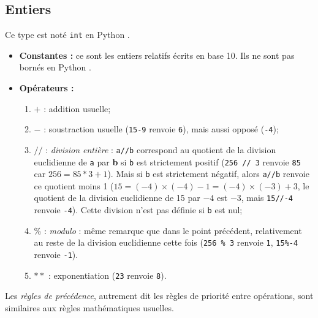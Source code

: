 \subsection{Entiers}
\begin{defi}[Entiers]
Ce type est noté \texttt{int} en Python .\\
\begin{itemize}
\item \textbf{Constantes :} ce sont les entiers relatifs écrits en base 10. Ils ne sont pas 
bornés en Python .
\item \textbf{Opérateurs :}
\begin{enumerate}
 \item $+$ : addition usuelle;
 \item $-$ : soustraction usuelle (\texttt{15-9} renvoie \texttt{6}), mais aussi opposé (\texttt{-4});
\item  $//$ : \emph{division entière} : \texttt{a//b} correspond au quotient de la 
division euclidienne de \texttt{a} par \textbf{b} si \texttt{b} est strictement positif 
(\texttt{256 // 3} renvoie \texttt{85} car $256 = 85*3 + 1$). Mais si \texttt{b} est strictement 
négatif, alors \texttt{a//b} renvoie ce quotient moins 1 ($15 = (-4)\times(-4)-1=(-4)\times(-3)+3$, 
le quotient de la division euclidienne de 15 par $-4$ est $-3$, mais \texttt{15//-4} renvoie 
\texttt{-4}). Cette division n'est pas définie si \texttt{b} est nul;
\item $\%$ : \emph{modulo} : même remarque que dans le point précédent, relativement au reste de la 
division euclidienne cette fois (\texttt{256 \% 3} renvoie 
\texttt{1}, \texttt{15\%-4} renvoie \texttt{-1}).
\item $**$ : exponentiation (\texttt{2\raisebox{0.3ex}{**}3} renvoie \texttt{8}).
\end{enumerate}
\end{itemize}
Les \emph{règles de précédence}, autrement dit les règles de priorité entre opérations, sont 
similaires aux règles mathématiques usuelles.
\end{defi}
